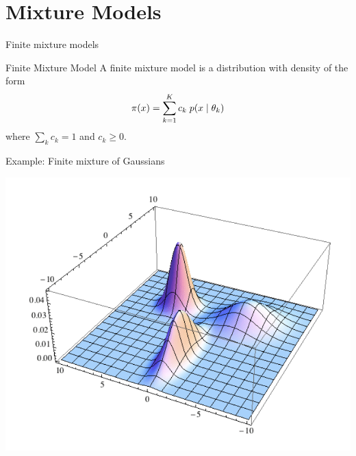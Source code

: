 \documentclass[10pt]{beamer}
\begin{document}
\section{Mixture Models} 

\begin{frame}{Finite mixture models}


\begin{sblock}{Finite Mixture Model}
A finite mixture model is a distribution with density of the form
\[ \pi(x) = \displaystyle\sum_{k=1}^K c_k \; p(x \; | \; \theta_k) \]
where $\sum_k c_k =1$ and $c_k \geq 0$.

\end{sblock}
\begin{sblock}{Example: Finite mixture of Gaussians}
\begin{center}
\includegraphics[width=.5\textwidth]{images/gmm}
\end{center}

\end{sblock}

\end{frame}
\end{document}
